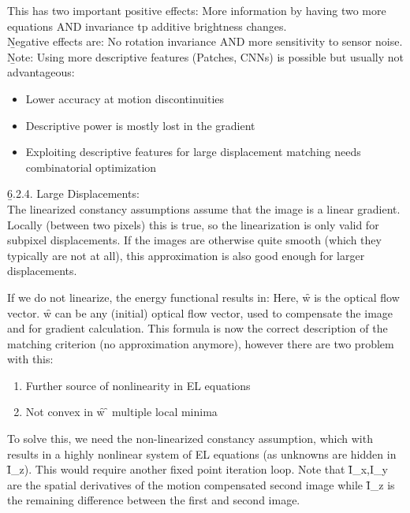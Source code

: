 This has two important \b{positive effects}: More information by having two more equations AND invariance tp additive brightness changes.\\
\b{Negative effects} are: No rotation invariance AND more sensitivity to sensor noise. \\

\b{Note:} Using more descriptive features (Patches, CNNs) is possible but usually not advantageous:
\begin{itemize}
    \item Lower accuracy at motion discontinuities
    \item Descriptive power is mostly lost in the gradient
    \item Exploiting descriptive features for large displacement matching needs combinatorial optimization
\end{itemize}
\vspace{0.5em}
\b{6.2.4. Large Displacements:\\[0.5em]}
The linearized constancy assumptions assume that the image is a linear gradient. Locally (between two pixels) this is true, so the linearization is only valid for subpixel displacements. If the images are otherwise quite smooth (which they typically are not at all), this approximation is also good enough for larger displacements.\newpage

If we do not linearize, the energy functional results in:
Here, \f{w} is the optical flow vector. \f{w} can be any (initial) optical flow vector, used to compensate the image and for gradient calculation. This formula is now the correct description of the matching criterion (no approximation anymore), however there are two problem with this:
\begin{enumerate}
    \item Further source of nonlinearity in EL equations
    \item Not convex in \f{w} \f{\to} multiple local minima
\end{enumerate}
To solve this, we need the non-linearized constancy assumption, which with
results in a highly nonlinear system of EL equations (as unknowns are hidden in \f{I_z}). This would require another fixed point iteration loop. Note that \f{I_x,I_y} are the spatial derivatives of the motion compensated second image while \f{I_z} is the remaining difference between the first and second image.\\

